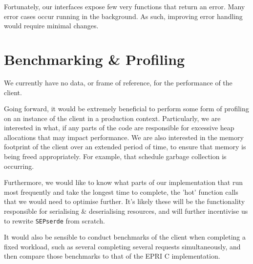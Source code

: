 Fortunately, our interfaces expose few very functions that return an error. Many error cases occur running in the background. As such, improving error handling would require minimal changes.

\section{Benchmarking \& Profiling}
We currently have no data, or frame of reference, for the performance of the client. 

Going forward, it would be extremely beneficial to perform some form of profiling on an instance of the client in a production context. Particularly, we are interested in what, if any parts of the code are responsible for excessive heap allocations that may impact performance.
We are also interested in the memory footprint of the client over an extended period of time, to ensure that memory is being freed appropriately. For example, that schedule garbage collection is occurring. 

Furthermore, we would like to know what parts of our implementation that run most frequently and take the longest time to complete, the 'hot' function calls that we would need to optimise further. It's likely these will be the functionality responsible for serialising \& deserialising resources, and will further incentivise us to rewrite \texttt{SEPserde} from scratch.

It would also be sensible to conduct benchmarks of the client when completing a fixed workload, such as several completing several requests simultaneously, and then compare those benchmarks to that of the EPRI C implementation.






